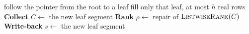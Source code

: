 \begin{algorithm}[t]
\caption{Refresh}
\label{alg:refresh_loser_tree_path}
follow the pointer from the root to a leaf\;
fill only that leaf, at most $h$ real rows\;
\textbf{Collect}\;
$C\leftarrow$ the new leaf segment\;
\textbf{Rank}\;
$\rho\leftarrow$ repair of $\mbox{\textsc{ListwiseRank}}(C)$\;
\textbf{Write-back}\;
$s\leftarrow$ the new leaf segment\;
\end{algorithm}